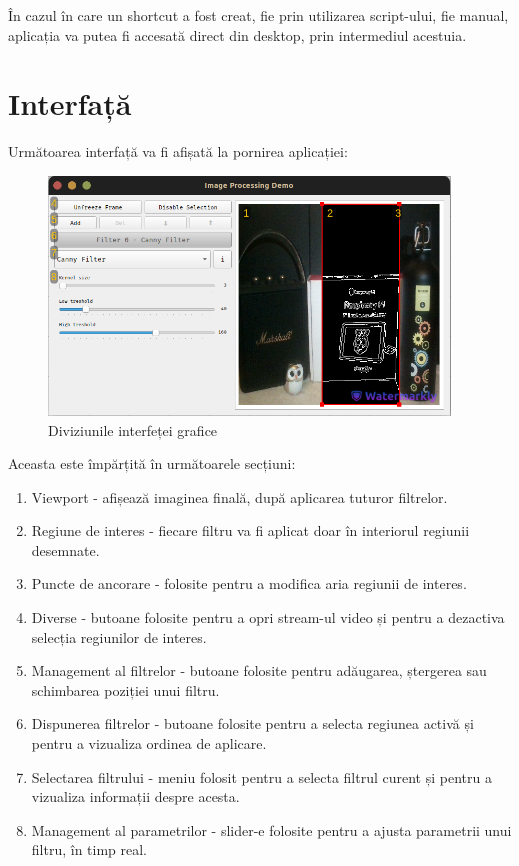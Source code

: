 În cazul în care un shortcut a fost creat, fie prin utilizarea script-ului, fie manual, aplicația va putea
fi accesată direct din desktop, prin intermediul acestuia.

\pagebreak
\section{Interfață}

Următoarea interfață va fi afișată la pornirea aplicației:
\begin{figure}[H]
	\includegraphics[width=0.95\textwidth, height=0.5\textwidth]{resources/Manual_Outline.jpg}
	\caption{Diviziunile interfeței grafice}
\end{figure}

Aceasta este împărțită în următoarele secțiuni:
\begin{enumerate}
	\item Viewport - afișează imaginea finală, după aplicarea tuturor filtrelor.
	\item Regiune de interes - fiecare filtru va fi aplicat doar în interiorul regiunii desemnate.
	\item Puncte de ancorare - folosite pentru a modifica aria regiunii de interes.
	\item Diverse - butoane folosite pentru a opri stream-ul video și pentru a dezactiva selecția regiunilor de interes.
	\item Management al filtrelor - butoane folosite pentru adăugarea, ștergerea sau schimbarea poziției unui filtru.
	\item Dispunerea filtrelor - butoane folosite pentru a selecta regiunea activă și pentru a vizualiza ordinea de aplicare.
	\item Selectarea filtrului - meniu folosit pentru a selecta filtrul curent și pentru a vizualiza informații despre acesta.
	\item Management al parametrilor - slider-e folosite pentru a ajusta parametrii unui filtru, în timp real.
\end{enumerate}

